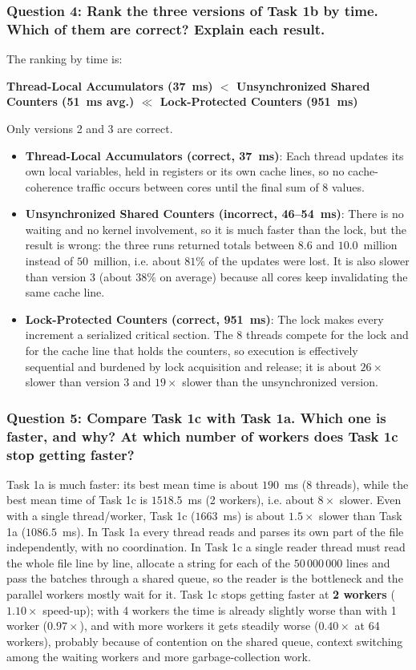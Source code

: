 \documentclass[11pt,a4paper]{article}
\begin{document}
\subsubsection{Question 4: Rank the three versions of Task 1b by time. Which of them are correct? Explain each result.}
The ranking by time is:
\begin{center}
\textbf{Thread-Local Accumulators (37~ms) $<$ Unsynchronized Shared Counters (51~ms avg.) $\ll$ Lock-Protected Counters (951~ms)}
\end{center}
Only versions 2 and 3 are correct.
\begin{itemize}
    \item \textbf{Thread-Local Accumulators (correct, 37~ms)}: Each thread updates its own local variables, held in registers or its own cache lines, so no cache-coherence traffic occurs between cores until the final sum of 8 values.
    \item \textbf{Unsynchronized Shared Counters (incorrect, 46--54~ms)}: There is no waiting and no kernel involvement, so it is much faster than the lock, but the result is wrong: the three runs returned totals between $8.6$ and $10.0$~million instead of $50$~million, i.e. about $81\%$ of the updates were lost. It is also slower than version 3 (about $38\%$ on average) because all cores keep invalidating the same cache line.
    \item \textbf{Lock-Protected Counters (correct, 951~ms)}: The lock makes every increment a serialized critical section. The 8 threads compete for the lock and for the cache line that holds the counters, so execution is effectively sequential and burdened by lock acquisition and release; it is about $26\times$ slower than version 3 and $19\times$ slower than the unsynchronized version.
\end{itemize}

\subsubsection{Question 5: Compare Task 1c with Task 1a. Which one is faster, and why? At which number of workers does Task 1c stop getting faster?}
Task 1a is much faster: its best mean time is about $190$~ms (8 threads), while the best mean time of Task 1c is $1518.5$~ms (2 workers), i.e. about $8\times$ slower. Even with a single thread/worker, Task 1c ($1663$~ms) is about $1.5\times$ slower than Task 1a ($1086.5$~ms). In Task 1a every thread reads and parses its own part of the file independently, with no coordination. In Task 1c a single reader thread must read the whole file line by line, allocate a string for each of the $50\,000\,000$ lines and pass the batches through a shared queue, so the reader is the bottleneck and the parallel workers mostly wait for it. Task 1c stops getting faster at \textbf{2 workers} ($1.10\times$ speed-up); with 4 workers the time is already slightly worse than with 1 worker ($0.97\times$), and with more workers it gets steadily worse ($0.40\times$ at 64 workers), probably because of contention on the shared queue, context switching among the waiting workers and more garbage-collection work.
\end{document}
